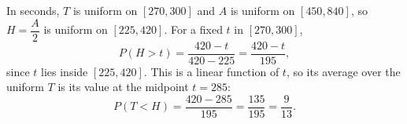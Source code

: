 In seconds, $T$ is uniform on $[270,300]$ and $A$ is uniform on $[450,840]$, so $H=\dfrac A2$ is uniform on $[225,420]$. For a fixed $t$ in $[270,300]$,
\[P(H>t)=\dfrac{420-t}{420-225}=\dfrac{420-t}{195},\]
since $t$ lies inside $[225,420]$. This is a linear function of $t$, so its average over the uniform $T$ is its value at the midpoint $t=285$:
\[P(T<H)=\dfrac{420-285}{195}=\dfrac{135}{195}=\boxed{\dfrac{9}{13}}.\]
